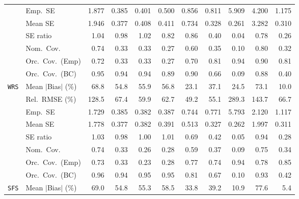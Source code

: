 \begin{landscape}
\begin{longtable}{llrrrrrrrrr}
 & Emp.\ SE & 1.877 & 0.385 & 0.401 & 0.500 & 0.856 & 0.811 & 5.909 & 4.200 & 1.175 \\
 & Mean SE & 1.946 & 0.377 & 0.408 & 0.411 & 0.734 & 0.328 & 0.261 & 3.282 & 0.310 \\
 & SE ratio & \cellcolor{ranktwo}1.04 & \cellcolor{rankone}0.98 & \cellcolor{rankone}1.02 & 0.82 & \cellcolor{rankthree}0.86 & 0.40 & 0.04 & 0.78 & 0.26 \\
 & Nom.\ Cov. & \cellcolor{ranktwo}0.74 & 0.33 & 0.33 & 0.27 & \cellcolor{rankthree}0.60 & 0.35 & 0.10 & \cellcolor{rankone}0.80 & 0.32 \\
 & Orc.\ Cov.\ (Emp) & 0.72 & 0.33 & 0.33 & 0.27 & 0.70 & \cellcolor{rankthree}0.81 & \cellcolor{rankone}0.94 & \cellcolor{ranktwo}0.90 & \cellcolor{rankthree}0.81 \\
 & Orc.\ Cov.\ (BC) & \cellcolor{rankone}0.95 & \cellcolor{ranktwo}0.94 & \cellcolor{ranktwo}0.94 & 0.89 & \cellcolor{rankthree}0.90 & 0.66 & 0.09 & 0.88 & 0.40 \\
\addlinespace[2pt]
\quad \texttt{WRS} & Mean $|$Bias$|$ (\%) & 68.8 & 54.8 & 55.9 & 56.8 & \cellcolor{ranktwo}23.1 & 37.1 & \cellcolor{rankthree}24.5 & 73.1 & \cellcolor{rankone}10.0 \\
 & Rel.\ RMSE (\%) & 128.5 & 67.4 & \cellcolor{rankthree}59.9 & 62.7 & \cellcolor{rankone}49.2 & \cellcolor{ranktwo}55.1 & 289.3 & 143.7 & 66.7 \\
 & Emp.\ SE & 1.729 & 0.385 & 0.382 & 0.387 & 0.744 & 0.771 & 5.793 & 2.120 & 1.117 \\
 & Mean SE & 1.778 & 0.377 & 0.382 & 0.391 & 0.513 & 0.327 & 0.262 & 1.997 & 0.311 \\
 & SE ratio & 1.03 & \cellcolor{rankthree}0.98 & \cellcolor{rankone}1.00 & \cellcolor{ranktwo}1.01 & 0.69 & 0.42 & 0.05 & 0.94 & 0.28 \\
 & Nom.\ Cov. & \cellcolor{ranktwo}0.74 & 0.33 & 0.26 & 0.28 & \cellcolor{rankthree}0.59 & 0.37 & 0.09 & \cellcolor{rankone}0.75 & 0.34 \\
 & Orc.\ Cov.\ (Emp) & 0.73 & 0.33 & 0.23 & 0.28 & 0.77 & 0.74 & \cellcolor{rankone}0.94 & \cellcolor{rankthree}0.78 & \cellcolor{ranktwo}0.85 \\
 & Orc.\ Cov.\ (BC) & \cellcolor{ranktwo}0.96 & \cellcolor{ranktwo}0.94 & \cellcolor{rankone}0.95 & \cellcolor{rankone}0.95 & 0.81 & 0.67 & 0.10 & \cellcolor{rankthree}0.93 & 0.42 \\
\addlinespace[2pt]
\quad \texttt{SFS} & Mean $|$Bias$|$ (\%) & 69.0 & 54.8 & 55.3 & 58.5 & \cellcolor{rankthree}33.8 & 39.2 & \cellcolor{ranktwo}10.9 & 77.6 & \cellcolor{rankone}5.4 \\

\end{longtable}
\end{landscape}
